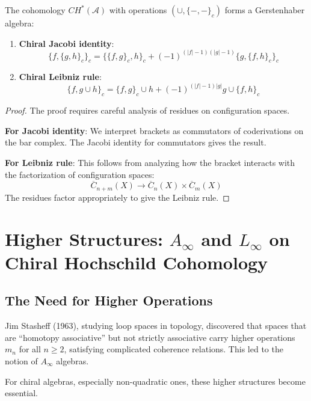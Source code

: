 \begin{theorem}
The cohomology $CH^*(\mathcal{A})$ with operations $(\cup, \{-,-\}_c)$ forms a Gerstenhaber algebra:
\begin{enumerate}
\item \textbf{Chiral Jacobi identity}: 
\[
\{f, \{g, h\}_c\}_c = \{\{f, g\}_c, h\}_c + (-1)^{(|f|-1)(|g|-1)} \{g, \{f, h\}_c\}_c
\]
\item \textbf{Chiral Leibniz rule}:
\[
\{f, g \cup h\}_c = \{f, g\}_c \cup h + (-1)^{(|f|-1)|g|} g \cup \{f, h\}_c
\]
\end{enumerate}
\end{theorem}

\begin{proof}
The proof requires careful analysis of residues on configuration spaces.

\textbf{For Jacobi identity}: We interpret brackets as commutators of coderivations on the bar complex. The Jacobi identity for commutators gives the result.

\textbf{For Leibniz rule}: This follows from analyzing how the bracket interacts with the factorization of configuration spaces:
\[
\overline{C}_{n+m}(X) \to \overline{C}_n(X) \times \overline{C}_m(X)
\]
The residues factor appropriately to give the Leibniz rule. \qedhere
\end{proof}


\section{Higher Structures: $A_\infty$ and $L_\infty$ on Chiral Hochschild Cohomology}

\subsection{The Need for Higher Operations}

Jim Stasheff (1963), studying loop spaces in topology, discovered that spaces that are ``homotopy associative'' but not strictly associative carry higher operations $m_n$ for all $n \geq 2$, satisfying complicated coherence relations. This led to the notion of $A_\infty$ algebras.

For chiral algebras, especially non-quadratic ones, these higher structures become essential.

